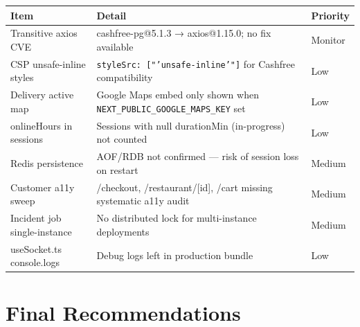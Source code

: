 \documentclass[11pt,a4paper]{article}
\begin{document}
\begin{tabularx}{\textwidth}{@{}p{4.5cm}Xp{2cm}@{}}
\toprule
\rowcolor{navyblue}\color{white}\bfseries Item & \color{white}\bfseries Detail & \color{white}\bfseries Priority \\
\midrule
Transitive axios CVE        & cashfree-pg@5.1.3 → axios@1.15.0; no fix available & Monitor \\
\rowcolor{rowalt}
CSP unsafe-inline styles    & \texttt{styleSrc: ["'unsafe-inline'"]} for Cashfree compatibility & Low \\
Delivery active map         & Google Maps embed only shown when \texttt{NEXT\_PUBLIC\_GOOGLE\_MAPS\_KEY} set & Low \\
\rowcolor{rowalt}
onlineHours in sessions     & Sessions with null durationMin (in-progress) not counted & Low \\
Redis persistence           & AOF/RDB not confirmed — risk of session loss on restart & Medium \\
\rowcolor{rowalt}
Customer a11y sweep         & /checkout, /restaurant/[id], /cart missing systematic a11y audit & Medium \\
Incident job single-instance & No distributed lock for multi-instance deployments & Medium \\
\rowcolor{rowalt}
useSocket.ts console.logs   & Debug logs left in production bundle & Low \\
\bottomrule
\end{tabularx}

\section{Final Recommendations}
\end{document}
